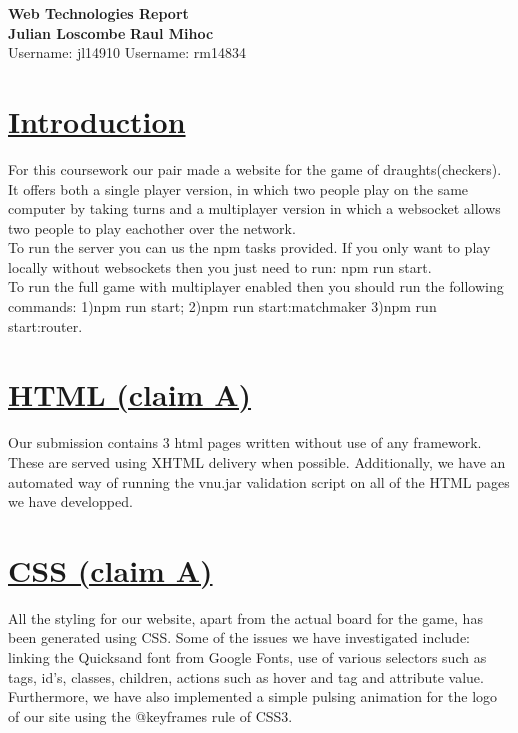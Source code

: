 \documentclass{article}
\begin{document}
 \begin{titlepage}
    \vspace*{4cm}
    \begin{center}
        \huge{\bfseries Web Technologies Report}\\
        \vspace*{10cm}
        \noindent
        \textbf{\large{Julian Loscombe}}
        \hfill
        \textbf{\large{Raul Mihoc}} \\
        \normalsize{\large{Username:} jl14910}
        \hfill
        \normalsize{\large{Username:} rm14834}
    \end{center}
 \end{titlepage}
 \section{\underline{Introduction}}\label{sec:intro}
    For this coursework our pair made a website for the game of draughts(checkers). 
    It offers both a single player version, in which two people play on the same computer by taking turns and a
    multiplayer version in which a websocket allows two people to play eachother over the network.\\
    \indent To run the server you can us the npm tasks provided. If you only want to play locally without websockets
    then you just need to run: npm run start.\\
    \indent To run the full game with multiplayer enabled then you should run the following
    commands: 1)npm run start; 2)npm run start:matchmaker 3)npm run start:router. 
 \section{\underline{HTML (claim A)}}\label{sec:HTML}
    Our submission contains 3 html pages written without use of any framework. These are served using XHTML delivery when possible.
    Additionally, we have an automated way of running the vnu.jar validation script on all of the HTML pages we have developped.
\section{\underline{CSS (claim A)}}\label{sec:CSS}
    All the styling for our website, apart from the actual board for the game, has been generated using CSS. Some of the issues we have 
    investigated include: linking the Quicksand font from Google Fonts, use of various selectors such as tags, id's, classes, children,
    actions such as hover and tag and attribute value. Furthermore, we have also implemented a simple pulsing animation for the logo
    of our site using the @keyframes rule of CSS3.
\end{document}
